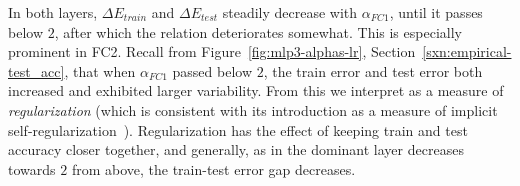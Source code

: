 In both layers, $\Delta E_{train}$ and $\Delta E_{test}$ steadily decrease with $\alpha_{FC1}$, until it passes below 
$2$, after which the relation deteriorates somewhat.
This is especially prominent in FC2. 
Recall from Figure~\ref{fig:mlp3-alphas-lr}, Section~\ref{sxn:empirical-test_acc}, that when $\alpha_{FC1}$ passed below $2$, the train error and test error both increased and exhibited larger variability. 
From this we interpret \ALPHA as a measure of \emph{regularization} (which is consistent with its introduction as a measure of 
implicit self-regularization~\cite{MM18_TR_JMLRversion}).
Regularization has the effect of keeping train and test accuracy closer together, and generally, as \ALPHA in the dominant layer decreases towards $2$ from above, the train-test error gap decreases.


